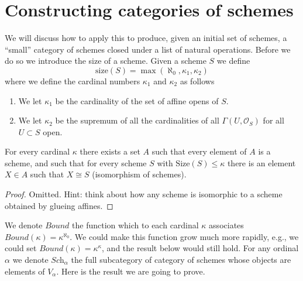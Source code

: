 \section{Constructing categories of schemes}
\label{section-categories-schemes}

\noindent
We will discuss how to apply this to produce, given an initial
set of schemes, a ``small'' category of schemes closed under
a list of natural operations. Before we do so we introduce the
size of a scheme. Given a scheme $S$ we define
$$
\text{size}(S) = \max(\aleph_0, \kappa_1, \kappa_2)
$$
where we define the cardinal numbers $\kappa_1$ and $\kappa_2$ as follows
\begin{enumerate}
\item We let $\kappa_1$ be the cardinality of the set of affine opens of $S$.
\item We let $\kappa_2$ be the supremum of all the cardinalities of
all $\Gamma(U, \mathcal{O}_S)$ for all $U \subset S$ open.
\end{enumerate}

\begin{lemma}
\label{lemma-bounded-size}
For every cardinal $\kappa$ there exists a set $A$ such
that every element of $A$ is a scheme, and such that for every
scheme $S$ with $\text{Size}(S) \leq \kappa$ there is
an element $X \in A$ such that $X \cong S$ (isomorphism
of schemes).
\end{lemma}

\begin{proof}
Omitted. Hint: think about how any scheme is isomorphic to a scheme
obtained by glueing affines.
\end{proof}

\noindent
We denote $Bound$ the function which to each
cardinal $\kappa$ associates $Bound(\kappa) = \kappa^{\aleph_0}$.
We could make this function grow much more rapidly, e.g., we could
set $Bound(\kappa) = \kappa^\kappa$, and the result below would still hold.
For any ordinal $\alpha$ we denote $\textit{Sch}_\alpha$ the full
subcategory of category of schemes whose objects are elements of
$V_\alpha$. Here is the result we are going to prove.

